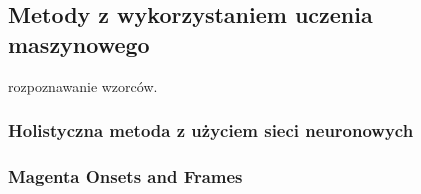 \documentclass[12pt,a4paper,twoside]{mwart}
\begin{document}
\subsection{Metody z wykorzystaniem uczenia maszynowego}
rozpoznawanie wzorców. \cite[6-8]{DBLP:journals/spm/BenetosDDE19}
\subsubsection{Holistyczna metoda z użyciem sieci neuronowych}\label{sec:multif0:petrusNetwork}
\cite{Transcription:Pertus:NeuralNetwork}
\subsubsection{Magenta Onsets and Frames}\label{sec:multif0:onsetsAndFrames}
\cite{performance-rnn-2017}
\end{document}
